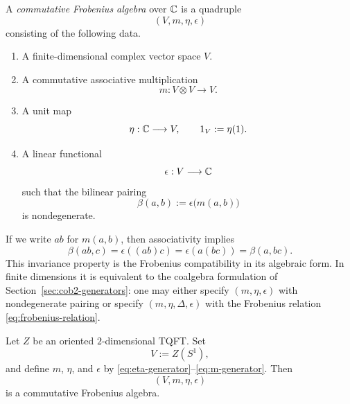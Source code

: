 \begin{definition}\label{def:commutative-frobenius}
A \emph{commutative Frobenius algebra} over $\mathbb{C}$ is a quadruple
\begin{equation}\label{eq:frobenius-quadruple}
(V,m,\eta,\epsilon)
\end{equation}
consisting of the following data.
\begin{enumerate}
\item A finite-dimensional complex vector space $V$.
\item A commutative associative multiplication
\begin{equation}\label{eq:frobenius-mult}
m : V \otimes V \longrightarrow V.
\end{equation}
\item A unit map
\begin{equation}\label{eq:frobenius-unit}
\eta : \mathbb{C} \longrightarrow V,
\qquad
1_V := \eta(1).
\end{equation}
\item A linear functional
\begin{equation}\label{eq:frobenius-counit}
\epsilon : V \longrightarrow \mathbb{C}
\end{equation}
such that the bilinear pairing
\begin{equation}\label{eq:frobenius-pairing}
\beta(a,b) := \epsilon\bigl(m(a,b)\bigr)
\end{equation}
is nondegenerate.
\end{enumerate}
\end{definition}

\begin{remark}\label{rem:frobenius-invariance}
If we write $ab$ for $m(a,b)$, then associativity implies
\begin{equation}\label{eq:beta-invariance}
\beta(ab,c) = \epsilon((ab)c) = \epsilon(a(bc)) = \beta(a,bc).
\end{equation}
This invariance property is the Frobenius compatibility in its algebraic form. In finite dimensions it is equivalent to the coalgebra formulation of Section~\ref{sec:cob2-generators}: one may either specify $(m,\eta,\epsilon)$ with nondegenerate pairing or specify $(m,\eta,\Delta,\epsilon)$ with the Frobenius relation \eqref{eq:frobenius-relation}.
\end{remark}

\begin{proposition}\label{prop:TQFT-to-Frob}
Let $Z$ be an oriented $2$-dimensional TQFT. Set
\begin{equation}\label{eq:V-from-TQFT}
V := Z(S^1),
\end{equation}
and define $m$, $\eta$, and $\epsilon$ by \eqref{eq:eta-generator}--\eqref{eq:m-generator}. Then
\begin{equation}\label{eq:TQFT-produces-Frob}
(V,m,\eta,\epsilon)
\end{equation}
is a commutative Frobenius algebra.
\end{proposition}

